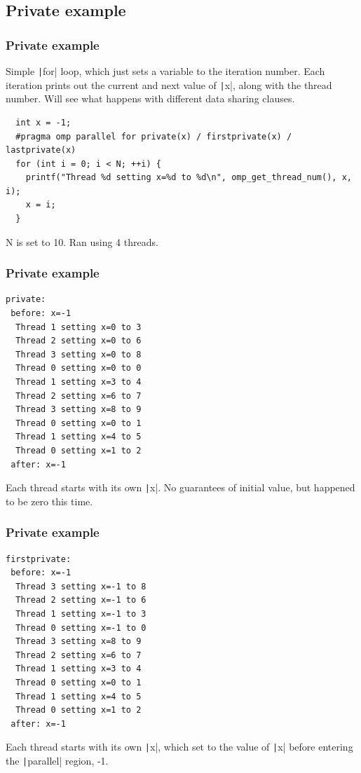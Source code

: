 \documentclass{beamer}
\begin{document}
\subsection{Private example}
\begin{frame}[fragile]
\frametitle{Private example}
Simple \texttt|for| loop, which just sets a variable to the iteration number.
Each iteration prints out the current and next value of \texttt|x|, along with the thread number.
Will see what happens with different data sharing clauses.

\begin{verbatim}
  int x = -1;
  #pragma omp parallel for private(x) / firstprivate(x) / lastprivate(x)
  for (int i = 0; i < N; ++i) {
    printf("Thread %d setting x=%d to %d\n", omp_get_thread_num(), x, i);
    x = i;
  }
\end{verbatim}
N is set to 10.
Ran using 4 threads.
\end{frame}

\begin{frame}[fragile]
\frametitle{Private example}
\begin{verbatim}
private:
 before: x=-1
  Thread 1 setting x=0 to 3
  Thread 2 setting x=0 to 6
  Thread 3 setting x=0 to 8
  Thread 0 setting x=0 to 0
  Thread 1 setting x=3 to 4
  Thread 2 setting x=6 to 7
  Thread 3 setting x=8 to 9
  Thread 0 setting x=0 to 1
  Thread 1 setting x=4 to 5
  Thread 0 setting x=1 to 2
 after: x=-1
\end{verbatim}
Each thread starts with its own \texttt|x|.
No guarantees of initial value, but happened to be zero this time.
\end{frame}

\begin{frame}[fragile]
\frametitle{Private example}
\begin{verbatim}
firstprivate:
 before: x=-1
  Thread 3 setting x=-1 to 8
  Thread 2 setting x=-1 to 6
  Thread 1 setting x=-1 to 3
  Thread 0 setting x=-1 to 0
  Thread 3 setting x=8 to 9
  Thread 2 setting x=6 to 7
  Thread 1 setting x=3 to 4
  Thread 0 setting x=0 to 1
  Thread 1 setting x=4 to 5
  Thread 0 setting x=1 to 2
 after: x=-1
\end{verbatim}
Each thread starts with its own \texttt|x|, which set to the value of \texttt|x| before entering the \texttt|parallel| region, -1.
\end{frame}
\end{document}
